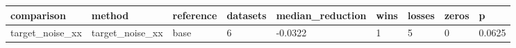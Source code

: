 \begin{tabular}{lllllllll}
\toprule
comparison & method & reference & datasets & median\_reduction & wins & losses & zeros & p \\
\midrule
target\_noise\_xx & target\_noise\_xx & base & 6 & -0.0322 & 1 & 5 & 0 & 0.0625 \\
\bottomrule
\end{tabular}

